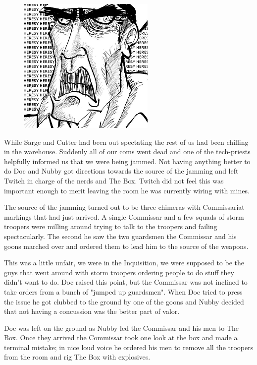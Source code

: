 \begin{figure}
	\begin{center}
		\includegraphics[width=\figwidth]{pics/4/22.png}
	\end{center}
\end{figure}
While Sarge and Cutter had been out spectating the rest of us had been chilling in the warehouse. 
Suddenly all of our coms went dead and one of the tech-priests helpfully informed us that we were being jammed. 
Not having anything better to do Doc and Nubby got directions towards the source of the jamming and left Twitch in charge of the nerds and The Box. 
Twitch did not feel this was important enough to merit leaving the room he was currently wiring with mines.

The source of the jamming turned out to be three chimeras with Commissariat markings that had just arrived. 
A single Commissar and a few squads of storm troopers were milling around trying to talk to the troopers and failing spectacularly. 
The second he saw the two guardsmen the Commissar and his goons marched over and ordered them to lead him to the source of the weapons.

This was a little unfair, we were in the Inquisition, we were supposed to be the guys that went around with storm troopers ordering people to do stuff they didn't want to do. 
Doc raised this point, but the Commissar was not inclined to take orders from a bunch of "jumped up guardsmen". 
When Doc tried to press the issue he got clubbed to the ground by one of the goons and Nubby decided that not having a concussion was the better part of valor.

Doc was left on the ground as Nubby led the Commissar and his men to The Box. 
Once they arrived the Commissar took one look at the box and made a terminal mistake; 
in nice loud voice he ordered his men to remove all the troopers from the room and rig The Box with explosives.

